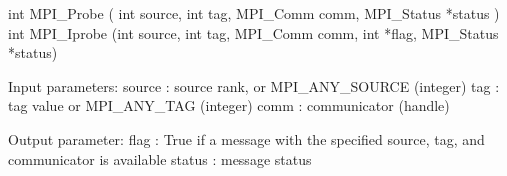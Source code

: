 int MPI_Probe
   ( int source, int tag, MPI_Comm comm,
    MPI_Status *status )
int MPI_Iprobe
   (int source, int tag, MPI_Comm comm, int *flag,
    MPI_Status *status)

Input parameters:
source : source rank, or MPI_ANY_SOURCE (integer)
tag    : tag value or MPI_ANY_TAG (integer)
comm   : communicator (handle)
       
Output parameter:
flag   : True if a message with the specified 
         source, tag, and communicator is available
status : message status

